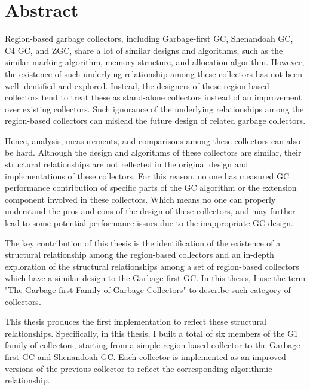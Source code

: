 \chapter*{Abstract}
\vspace{-1em}


Region-based garbage collectors, including Garbage-first GC, Shenandoah GC, C4 GC, and ZGC,
share a lot of similar designs and algorithms, such as
the similar marking algorithm, memory structure, and allocation algorithm.
However, the existence of such underlying relationship among these collectors
has not been well identified and explored.
Instead, the designers of these region-based collectors tend to treat these as
stand-alone collectors instead of an improvement over existing collectors.
Such ignorance of the underlying relationships among the region-based collectors
can mislead the future design of related garbage collectors. 

Hence, analysis, measurements, and comparisons among these collectors can also be hard.
Although the design and algorithms of these collectors are similar,
their structural relationships are not reflected in the
original design and implementations of these collectors.
For this reason, no one has measured
GC performance contribution of specific parts of the GC algorithm or the extension component involved
in these collectors.
Which means no one can properly understand the pros and cons
of the design of these collectors, and may further lead to some potential performance
issues due to the inappropriate GC design.


The key contribution of this thesis is the identification of the existence of a
structural relationship among the region-based collectors and an in-depth exploration
of the structural relationships among a set of region-based collectors which have a similar
design to the Garbage-first GC. In this thesis, I use the term
"The Garbage-first Family of Garbage Collectors" to describe such category of collectors.

This thesis produces the first implementation to reflect these structural relationships.
Specifically, in this thesis, I built a total of six members of the G1 family
of collectors, starting from a simple region-based
collector to the Garbage-first GC and Shenandoah GC.
Each collector is implemented as an improved versions of the previous collector to reflect
the corresponding algorithmic relationship.

